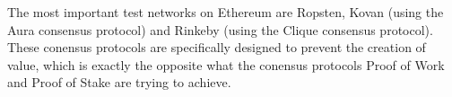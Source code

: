 The most important test networks on Ethereum are Ropsten, Kovan (using the Aura consensus protocol) and Rinkeby (using the Clique consensus protocol). These conensus protocols are specifically designed to prevent the creation of value, which is exactly the opposite what the conensus protocols Proof of Work and Proof of Stake are trying to achieve.